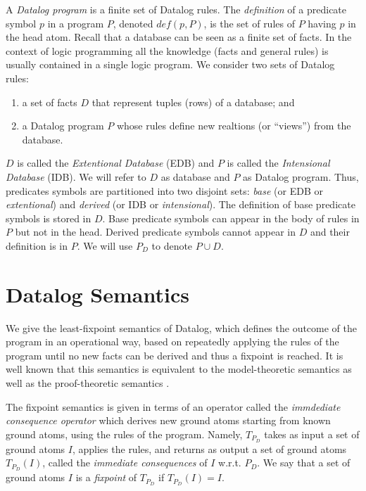 \documentclass[twoside,11pt,openright]{report}
\theoremstyle{definition}
\begin{document}
A \textit{Datalog program} is a finite set of Datalog rules. The \textit{definition} of a predicate symbol $p$
in a program $P$, denoted $def(p, P)$, is the set of rules of $P$ having $p$ in the head atom.
Recall that a database can be seen as a finite set of facts. In the context of logic programming
all the knowledge (facts and general rules) is usually contained in a single logic program.
We consider two sets of Datalog rules:
\begin{enumerate}
  \item a set of facts $D$ that represent tuples (rows) of a database; and
  \item a Datalog program $P$ whose rules define new realtions (or ``views'') from the database.
\end{enumerate}
$D$ is called the \textit{Extentional Database} (EDB) and $P$ is called the \textit{Intensional Database} (IDB).
We will refer to $D$ as database and $P$ as Datalog program.
Thus, predicates symbols are partitioned into two disjoint sets: \textit{base} (or EDB or \textit{extentional}) and
\textit{derived} (or IDB or \textit{intensional}).
The definition of base predicate symbols is stored in $D$.
Base predicate symbols can appear in the body of rules in $P$ but not in the head.
Derived predicate symbols cannot appear in $D$ and their definition is in $P$. We will use $P_D$ to denote $P \cup D$.

\section{Datalog Semantics}

We give the least-fixpoint semantics of Datalog, which defines the outcome of the program in an operational way,
based on repeatedly applying the rules of the program until no new facts can be derived and thus a fixpoint is reached.
It is well known that this semantics is equivalent to the model-theoretic semantics as well as
the proof-theoretic semantics \cite{10.5555/551350}.

The fixpoint semantics is given in terms of an operator called the \textit{immdediate consequence operator}
which derives new ground atoms starting from known ground atoms, using the rules of the program.
Namely, $T_{P_D}$ takes as input a set of ground atoms $I$, applies the rules, and returns as output a set of ground atoms $T_{P_D}(I)$,
called the \textit{immediate consequences} of $I$ w.r.t. $P_D$.
We say that a set of ground atoms $I$ is a \textit{fixpoint}
of $T_{P_D}$ if $T_{P_D}(I) = I$.
\end{document}
